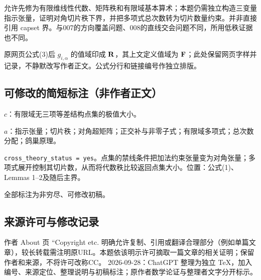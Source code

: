 \documentclass[UTF8,11pt]{ctexart}
\theoremstyle{definition}
\begin{document}
允许先修为有限维线性代数、矩阵秩和有限域基本算术；本题仍需独立构造三变量指示张量，证明对角切片秩下界，并把多项式总次数转为切片数量约束。并非直接引用 capset 界。与007的方向覆盖问题、008的直线交会问题不同，所用低秩证据也不同。

原网页公式(3)后 $g_{i,\alpha}$ 的值域印成 ${\bf R}$，其上文定义值域为 ${\bf F}$；此处保留网页字样并记录，不静默改写作者正文。公式分行和链接编号作独立排版。
\subsection*{可修改的简短标注（非作者正文）}
$c$：有限域无三项等差结构点集的极值大小。

$a$：指示张量；切片秩；对角超矩阵；正交补与非零子式；有限域多项式；总次数分配；鸽巢原理。

\texttt{cross\_theory\_status = yes}。点集的禁线条件把加法约束张量变为对角张量；多项式展开控制其切片数，从而将代数秩比较返回点集大小。位置：公式(1)、Lemmas 1--2及随后主界。

全部标注为非穷尽、可修改初稿。
\subsection*{来源许可与修改记录}
作者 About 页 ``Copyright etc. 明确允许复制、引用或翻译合理部分（例如单篇文章），较长转载需注明原URL。本题依该明示许可摘取一篇文章的相关证明；保留作者和来源，不将许可改称CC。
2026-09-28：ChatGPT 整理为独立 TeX，加入编号、来源定位、整理说明与初稿标注；原作者数学论证与整理者文字分开标示。
\end{document}
